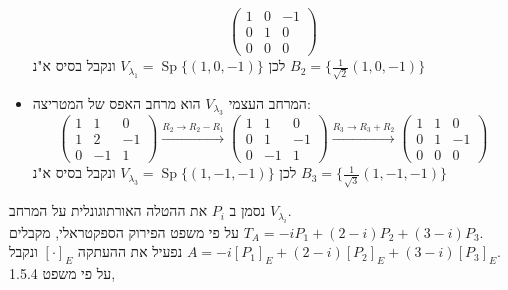 \documentclass{article}
\DeclareMathOperator{\Sp}{Sp}
\begin{document}
\begin{itemize}
\[              \begin{pmatrix}
                  1 & 0 & -1 \\
                  0 & 1 & 0  \\
                  0 & 0 & 0
              \end{pmatrix}
          \]
          לכן $V_{\lambda_1}=\Sp\{ (1, 0, -1) \}$ ונקבל בסיס א"נ $B_2=\{ \frac{1}{\sqrt{2}}(1, 0, -1) \}$
    \item המרחב העצמי $V_{\lambda_3}$ הוא מרחב האפס של המטריצה: \\
          \[
              \begin{pmatrix}
                  1 & 1  & 0  \\
                  1 & 2  & -1 \\
                  0 & -1 & 1
              \end{pmatrix} \xrightarrow[]{R_2\rightarrow R_2-R_1}
              \begin{pmatrix}
                  1 & 1  & 0  \\
                  0 & 1  & -1 \\
                  0 & -1 & 1
              \end{pmatrix} \xrightarrow[]{R_3\rightarrow R_3+R_2}
              \begin{pmatrix}
                  1 & 1 & 0  \\
                  0 & 1 & -1 \\
                  0 & 0 & 0
              \end{pmatrix}
          \]
          לכן $V_{\lambda_3}=\Sp\{ (1, -1, -1) \}$ ונקבל בסיס א"נ $B_3=\{ \frac{1}{\sqrt{3}}(1, -1, -1) \}$
\end{itemize}
נסמן ב $P_i$ את ההטלה האורתוגונלית על המרחב $V_{\lambda_i}$.\\
על פי משפט הפירוק הספקטראלי, מקבלים $T_A=-iP_1+(2-i)P_2+(3-i)P_3$. \\
נפעיל את ההעתקה $[\cdot]_E$ ונקבל $A = -i[P_1]_E+(2-i)[P_2]_E+(3-i)[P_3]_E$. \\
על פי משפט 1.5.4,
\end{document}
